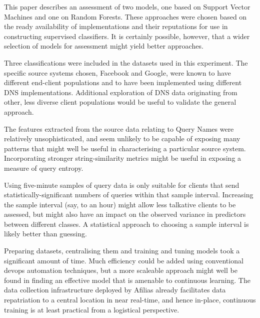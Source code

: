 \documentclass[conference]{IEEEtran}
\begin{document}
This paper describes an assessment of two models, one based on Support
Vector Machines and one on Random Forests. These approaches were chosen
based on the ready availability of implementations and their reputations
for use in constructing supervised classifiers. It is certainly
possible, however, that a wider selection of models for assessment might
yield better approaches.

Three classifications were included in the datasets used in this
experiment. The specific source systems chosen, Facebook and Google,
were known to have different end-client populations and to have been
implemented using different DNS implementations. Additional exploration
of DNS data originating from other, less diverse client populations
would be useful to validate the general approach.

The features extracted from the source data relating to Query Names were
relatively unsophisticated, and seem unlikely to be capable of exposing
many patterns that might well be useful in characterising a particular
source system. Incorporating stronger string-similarity metrics might be
useful in exposing a measure of query entropy.

Using five-minute samples of query data is only suitable for clients
that send statistically-significant numbers of queries within that
sample interval. Increasing the sample interval (say, to an hour) might
allow less talkative clients to be assessed, but might also have an
impact on the observed variance in predictors between different classes.
A statistical approach to choosing a sample interval is likely better
than guessing.

Preparing datasets, centralising them and training and tuning models
took a significant amount of time. Much efficiency could be added using
conventional devops automation techniques, but a more scaleable approach
might well be found in finding an effective model that is amenable to
continuous learning. The data collection infrastructure deployed by
Afilias already facilitates data repatriation to a central location in
near real-time, and hence in-place, continuous training is at least
practical from a logistical perspective.
\end{document}
